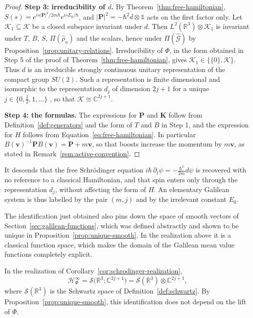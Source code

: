 \begin{proof}
	\medskip
	\noindent\textbf{Step 3: irreducibility of $d$.} By Theorem~\ref{thm:free-hamiltonian}, $S(s)=e^{is|\mathbf{P}|^2/2m\hbar}e^{isE_0/\hbar}$, and $|\mathbf{P}|^2=-\hbar^2d\otimes\mathbb{1}$ acts on the first factor only. Let $\mathcal{K}_1\subseteq\mathcal{K}$ be a closed subspace invariant under $d$. Then $L^2(\mathbb{R}^3)\otimes\mathcal{K}_1$ is invariant under $T$, $B$, $S$, $\Pi(\hat\rho_u)$ and the scalars, hence under $\Pi(\widehat{\mathcal{G}})$ by Proposition~\ref{prop:unitary-relations}. Irreducibility of $\Phi$, in the form obtained in Step 5 of the proof of Theorem~\ref{thm:free-hamiltonian}, gives $\mathcal{K}_1\in\{\{0\},\mathcal{K}\}$. Thus $d$ is an irreducible strongly continuous unitary representation of the compact group $SU(2)$. Such a representation is finite dimensional and isomorphic to the representation $d_j$ of dimension $2j+1$ for a unique $j\in\{0,\tfrac{1}{2},1,\dots\}$ \cite[TODO-location]{TODO-Hal03}, so that $\mathcal{K}\cong\mathbb{C}^{2j+1}$.
	
	\medskip
	\noindent\textbf{Step 4: the formulas.} The expressions for $\mathbf{P}$ and $\mathbf{K}$ follow from Definition~\ref{def:generators} and the form of $T$ and $B$ in Step 1, and the expression for $H$ follows from Equation~\eqref{eq:free-hamiltonian}. In particular $B(\mathbf{v})^{-1}\mathbf{P}B(\mathbf{v})=\mathbf{P}+m\mathbf{v}$, so that boosts increase the momentum by $m\mathbf{v}$, as stated in Remark~\ref{rem:active-convention}.
\end{proof}

\noindent It descends that the free Schrödinger equation $i\hbar\,\partial_t\psi=-\tfrac{\hbar^2}{2m}d\psi$ is recovered with no reference to a classical Hamiltonian, and that spin enters only through the representation $d_j$, without affecting the form of $H$. An elementary Galilean system is thus labelled by the pair $(m,j)$ and by the irrelevant constant $E_0$.

The identification just obtained also pins down the space of smooth vectors of Section~\ref{sec:galilean-functions}, which was defined abstractly and shown to be unique in Proposition~\ref{prop:unique-smooth}. In the realization above it is a classical function space, which makes the domain of the Galilean mean value functions completely explicit.

\begin{proposition}\label{prop:smooth-schwartz}
	In the realization of Corollary~\ref{cor:schrodinger-realization},
	\begin{equation*}
		\mathcal{H}^\infty_\Phi=\mathcal{S}\big(\mathbb{R}^3;\mathbb{C}^{2j+1}\big)=\mathcal{S}(\mathbb{R}^3)\otimes\mathbb{C}^{2j+1},
	\end{equation*}
	where $\mathcal{S}(\mathbb{R}^3)$ is the Schwartz space of Definition~\ref{def:schwartz}. By Proposition~\ref{prop:unique-smooth}, this identification does not depend on the lift of $\Phi$.
\end{proposition}

